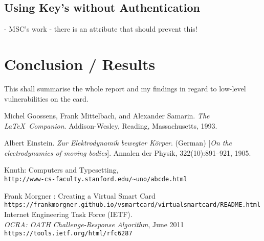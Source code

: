 \documentclass[bsc,frontabs,twoside,singlespacing,parskip,deptreport]{infthesis}     %
\begin{document}
\section{Using Key's without Authentication}
- MSC's work
- there is an attribute that should prevent this!

\chapter{Conclusion / Results}

This shall summarise the whole report and my findings in regard to low-level vulnerabilities on the card. 




%
\begin{thebibliography}{}

Michel Goossens, Frank Mittelbach, and Alexander Samarin. 
\textit{The \LaTeX\ Companion}. 
Addison-Wesley, Reading, Massachusetts, 1993.
 
Albert Einstein. 
\textit{Zur Elektrodynamik bewegter K{\"o}rper}. (German) 
[\textit{On the electrodynamics of moving bodies}]. 
Annalen der Physik, 322(10):891–921, 1905.
 
Knuth: Computers and Typesetting,
\\\texttt{http://www-cs-faculty.stanford.edu/\~{}uno/abcde.html}

Frank Morgner : Creating a Virtual Smart Card\\
\texttt{https://frankmorgner.github.io/vsmartcard/virtualsmartcard/README.html}\\

Internet Engineering Task Force (IETF).\\
\textit{OCRA: OATH Challenge-Response Algorithm}, June 2011\\
\texttt{https://tools.ietf.org/html/rfc6287}


\end{thebibliography}
\end{document}
